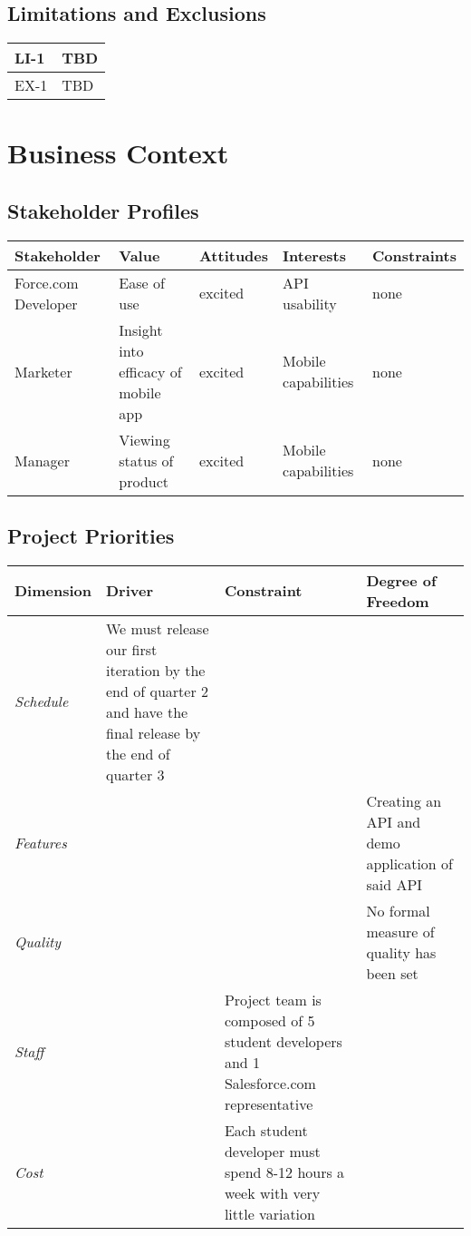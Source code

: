 \documentclass[12pt,oneside,letterpaper]{article}
\begin{document}
\subsection{Limitations and Exclusions}
\begin{tabular} {| p{1in} | p{4.5in} |}
\hline
LI-1 & TBD\\
\hline
EX-1 & TBD\\
\hline
\end {tabular}

\section{Business Context}
\subsection{Stakeholder Profiles}
\begin{tabular} {| p{1in} | p{1in} | p{1in} | p{1in} | p{1in} |}
\hline
\textbf{Stakeholder} & \textbf{Value} & \textbf{Attitudes} & \textbf{Interests} & \textbf{Constraints}\\
\hline
Force.com Developer &Ease of use &excited& API usability& none \\ 
\hline
Marketer &Insight into efficacy of mobile app&excited&Mobile capabilities & none \\ 
\hline
Manager &Viewing status of product&excited&Mobile capabilities & none \\ 
\hline
\end {tabular}

\subsection{Project Priorities}
\begin{tabular} {| p{1in} | p{1.5in} | p{1.5in} | p{1.6in} |}
\hline
\textbf{Dimension} & \textbf{Driver} & \textbf{Constraint} & \textbf{Degree of Freedom} \\
\hline
\em Schedule\em &We must release our first iteration by the end of quarter 2 and have the final release by the end of quarter 3&& \\ 
\hline
\em Features \em &&& Creating an API and demo application of said API \\ 
\hline
\em Quality \em &&& No formal measure of quality has been set \\ 
\hline
\em Staff \em &&Project team is composed of 5 student developers and 1 Salesforce.com representative & \\ 
\hline
\em Cost \em &&Each student developer must spend 8-12 hours a week with very little variation & \\ 
\hline
\end {tabular}
\end{document}
